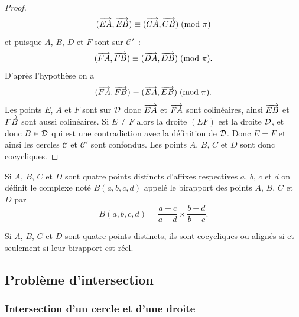 \begin{proof}
\begin{equation}
        (\overrightarrow{EA},\overrightarrow{EB}) \equiv (\overrightarrow{CA},\overrightarrow{CB})\!\pmod {\pi}
    \end{equation}
    et puisque \(A\), \(B\), \(D\) et \(F\) sont sur \(\mathcal{C}'\)~:
    \begin{equation}
        (\overrightarrow{FA},\overrightarrow{FB}) \equiv (\overrightarrow{DA},\overrightarrow{DB})\!\pmod {\pi}.
    \end{equation}
    D'après l'hypothèse on a \begin{equation}
        (\overrightarrow{FA},\overrightarrow{FB}) \equiv (\overrightarrow{EA},\overrightarrow{EB})\!\pmod {\pi}.
    \end{equation}
    Les points \(E\), \(A\) et \(F\) sont sur \(\mathcal{D}\) donc \(\overrightarrow{EA}\) et 
    \(\overrightarrow{FA}\) sont colinéaires, ainsi \(\overrightarrow{EB}\) et \(\overrightarrow{FB}\) sont 
    aussi colinéaires. Si \(E \neq F\) alors la droite \((EF)\) est la droite 
    \(\mathcal{D}\), et donc \(B \in \mathcal{D}\) qui est une contradiction avec la définition 
    de \(\mathcal{D}\). Donc \(E = F\) et ainsi les cercles \(\mathcal{C}\) et 
    \(\mathcal{C}'\) sont confondus. Les points \(A\), \(B\), \(C\) et \(D\) 
    sont donc cocycliques.
\end{proof}

\begin{defdef}[Birapport]
    Si \(A\), \(B\), \(C\) et \(D\) sont quatre points distincts d'affixes 
    respectives \(a\), \(b\), \(c\) et \(d\) on définit le complexe noté 
    \(B(a , b , c , d)\) appelé le birapport des points \(A\), \(B\), \(C\) et \(D\) 
    par
    \begin{equation}
        B(a , b , c , d) = \frac{a - c}{a - d} \times \frac{b - d}{b - c}.
    \end{equation}
\end{defdef}

\begin{theo}
    Si \(A\), \(B\), \(C\) et \(D\) sont quatre points distincts, ils sont 
    cocycliques ou alignés si et seulement si leur birapport est réel.
\end{theo}

\subsection{Problème d'intersection}

\subsubsection{Intersection d'un cercle et d'une droite}

